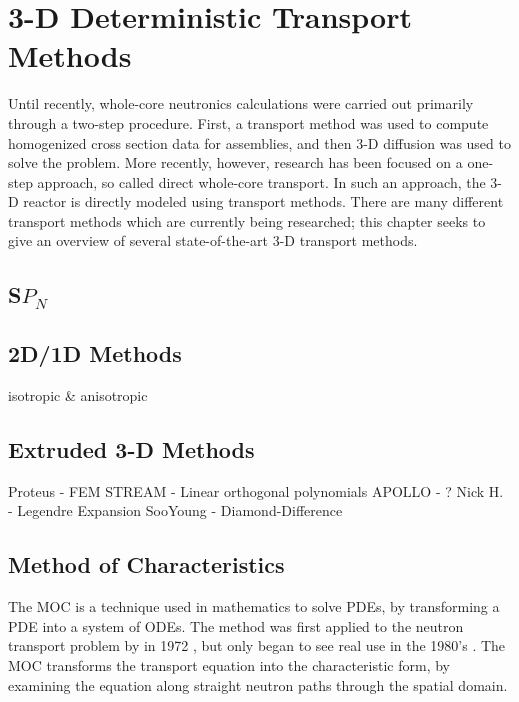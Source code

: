 \chapter{3-D Deterministic Transport Methods}{\label{ch:3-D Transport}
  
  
  
  \def\figpath{chapters/04/figures/}
  \graphicspath{ {\figpath} }

  Until recently, whole-core neutronics calculations were carried out primarily through a two-step procedure.
  First, a transport method was used to compute homogenized cross section data for assemblies, and then 3-D diffusion was used to solve the problem.
  More recently, however, research has been focused on a one-step approach, so called direct whole-core transport.
  In such an approach, the 3-D reactor is directly modeled using transport methods.
  There are many different transport methods which are currently being researched; this chapter seeks to give an overview of several state-of-the-art 3-D transport methods.

  \section{S\texorpdfstring{$P_N$}{PN}}{\label{sec:3T:SPN}

  }

  \section{2D/1D Methods}{\label{sec:3T:2D/1D Methods}
    isotropic \& anisotropic
  }

  \section{Extruded 3-D Methods}{\label{sec:3T:Extruded 3-D Methods}
    Proteus - FEM
    STREAM - Linear orthogonal polynomials
    APOLLO - ?
    Nick H. - Legendre Expansion
    SooYoung - Diamond-Difference
  }

  \section{Method of Characteristics}{\label{sec:3T:Method of Characteristics}
    The \acf{MOC} is a technique used in mathematics to solve \acp{PDE}, by transforming a \ac{PDE} into a system of \acp{ODE}.
    The method was first applied to the neutron transport problem by \citeauthor{Askew1972} in 1972 \cite{Askew1972}, but only began to see real use in the 1980's \cite{Halsall1980}.
    The \ac{MOC} transforms the transport equation into the characteristic form, by examining the equation along straight neutron paths through the spatial domain.

}}
